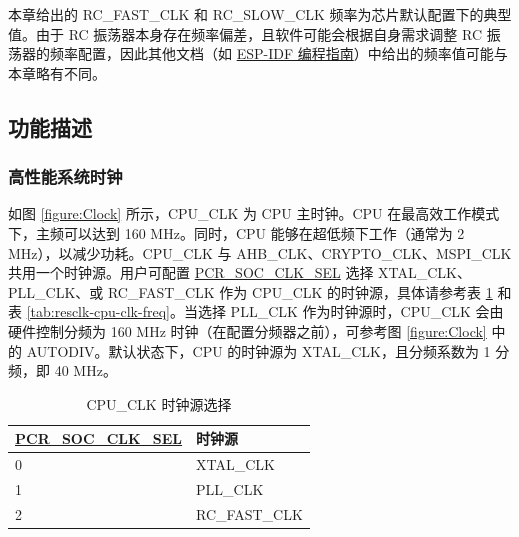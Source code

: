 \documentclass[main\_\_CN.tex]{subfiles}
\begin{document}
\begin{tiplisting}
本章给出的 RC\_FAST\_CLK 和 RC\_SLOW\_CLK 频率为芯片默认配置下的典型值。由于 RC 振荡器本身存在频率偏差，且软件可能会根据自身需求调整 RC 振荡器的频率配置，因此其他文档（如 \href{https://docs.espressif.com/projects/esp-idf/zh_CN/latest/esp32c6/api-reference/peripherals/clk_tree.html}{ESP-IDF 编程指南}）中给出的频率值可能与本章略有不同。
\end{tiplisting}

\subsection{功能描述}

\subsubsection{高性能系统时钟}

如图 \ref{figure:Clock} 所示，CPU\_CLK 为 CPU 主时钟。CPU 在最高效工作模式下，主频可以达到 160 MHz。同时，CPU 能够在超低频下工作（通常为 2 MHz），以减少功耗。CPU\_CLK 与 AHB\_CLK、CRYPTO\_CLK、MSPI\_CLK 共用一个时钟源。用户可配置 \hyperref[fielddesc:PCRSOCCLKSEL]{PCR\_SOC\_CLK\_SEL} 选择 XTAL\_CLK、PLL\_CLK、或 RC\_FAST\_CLK 作为 CPU\_CLK 的时钟源，具体请参考表 \ref{tab:resclk-cpu-clk-src} 和表 \ref{tab:resclk-cpu-clk-freq}。当选择 PLL\_CLK 作为时钟源时，CPU\_CLK 会由硬件控制分频为 160 MHz 时钟（在配置分频器之前），可参考图 \ref{figure:Clock} 中的 AUTODIV。默认状态下，CPU 的时钟源为 XTAL\_CLK，且分频系数为 1 分频，即 40 MHz。

\begin{longtable}[c]{|p{5cm}|p{5cm}| }
       \caption{CPU\_CLK 时钟源选择}
		\label{tab:resclk-cpu-clk-src} \\
	    \hline
        \rowcolor{lightgray}
        \textbf{\hyperref[fielddesc:PCRSOCCLKSEL]{PCR\_SOC\_CLK\_SEL}} & \textbf{时钟源} \\
        \hline
        0 & XTAL\_CLK \\
        \hline
        1 & PLL\_CLK \\
        \hline
        2 & RC\_FAST\_CLK \\
        \hline
\end{longtable}
\end{document}
